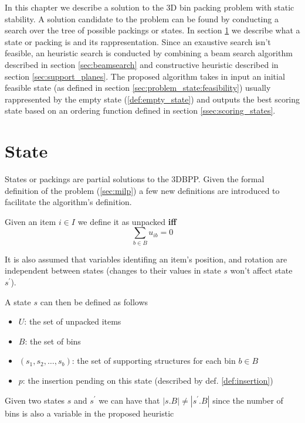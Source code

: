In this chapter we describe a solution to the 3D bin packing problem with static stability.
A solution candidate to the problem can be found by conducting a search over the tree of possible packings or states. In section \ref{sec:problem_state} we describe what a state or packing is and its rappresentation.
Since an exaustive search isn't feasible, an heuristic search is conducted by combining a beam search algorithm described in section \ref{sec:beamsearch} and constructive heuristic described in section \ref{sec:support_planes}.
The proposed algorithm takes in input an initial feasible state (as defined in section \ref{sec:problem_state:feasibility}) usually rappresented by the empty state (\ref{def:empty_state}) and outputs the best scoring state based on an ordering function defined in section \ref{ssec:scoring_states}.

\section{State}
\label{sec:problem_state}%
States or packings are partial solutions to the 3DBPP. Given the formal definition of the problem (\ref{sec:milp}) a few new definitions are introduced to facilitate the algorithm's definition.
\begin{definition}
    Given an item $i \in I$ we define it as unpacked \textbf{iff}
    \begin{equation*}
        \sum_{b \in B} u_{ib} = 0
    \end{equation*}
\end{definition}

It is also assumed that variables identifing an item's position, and rotation are independent between states (changes to their values in state $s$ won't affect state $s^\prime$).

A state $s$ can then be defined as follows
\begin{itemize}
    \item $U$: the set of unpacked items
    \item $B$: the set of bins
    \item $(s_1, s_2,\dots, s_b)$: the set of supporting structures for each bin $b \in B$
    \item $p$: the insertion pending on this state (described by def. \ref{def:insertion})
\end{itemize}

\begin{observation}
    Given two states $s$ and $s^\prime$ we can have that $|s.B| \neq |s^\prime.B|$ since the number of bins is also a variable in the proposed heuristic
\end{observation}

